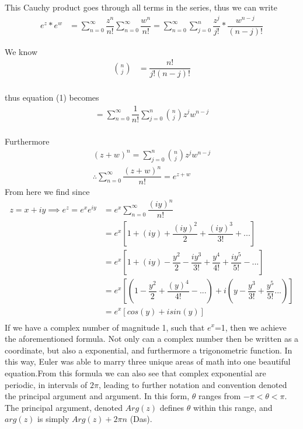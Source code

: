 \documentclass[12pt]{article}
\begin{document}
This Cauchy product goes through all terms in the series, thus we can write
\begin{align*}
e^z*e^w&=\sum_{n=0}^{\infty}\dfrac{z^n}{n!}\sum_{n=0}^{\infty}\dfrac{w^n}{n!}
=\sum_{n=0}^{\infty}\sum_{j=0}^{n}\dfrac{z^j}{j!}*\dfrac{w^{n-j}}{(n-j)!}
\end{align*}

We know
\begin{align*}
\binom nj &=\dfrac{n!}{j!(n-j)!}\\
\end{align*}

thus equation (1) becomes
\begin{align*}
=\sum_{n=0}^{\infty}\dfrac{1}{n!}\sum_{j=0}^{n} \binom nj z^jw^{n-j}\\
\end{align*}

Furthermore
\begin{align*}
    (z+w)^n=\sum_{j=0}^{n} \binom nj z^jw^{n-j}\\
    \therefore \sum_{n=0}^{\infty} \dfrac {(z+w)^n}{n!} = e^{z+w}
\end{align*}
From here we find since 
\begin{align*}
    z=x+iy\implies e^z=e^xe^{iy} &= e^x\sum_{n=0}^{\infty} \dfrac {(iy)^n}{n!}\\
    &= e^x[1+(iy)+\dfrac{(iy)^2}{2}+\dfrac{(iy)^3}{3!}+...]\\
    &= e^x[1+(iy)-\dfrac{y^2}{2}-\dfrac{iy^3}{3!}+\dfrac{y^4}{4!}+\dfrac{iy^5}{5!}-...]\\
    &= e^x[(1-\dfrac{y^2}{2}+\dfrac{(y)^4}{4!}-...)+i(y-\dfrac{y^3}{3!}+\dfrac{y^5}{5!}...)]\\
    &=e^x[cos(y)+isin(y)]\\
\end{align*}
\hspace{\parindent}If we have a complex number of magnitude 1, such that $e^x$=1, then we achieve the aforementioned formula. Not only can a complex number then be written as a coordinate, but also a exponential, and furthermore a trigonometric function. In this way, Euler was able to marry three unique areas of math into one beautiful equation.From this formula we can also see that complex exponential are periodic, in intervals of $2\pi$, leading to further notation and convention denoted the principal argument and argument. In this form, $\theta$ ranges from $-\pi<\theta<\pi$. The principal argument, denoted $Arg(z)$ defines $\theta$ within this range, and $arg(z)$ is simply $Arg(z)+2\pi n$ (Das).
\end{document}
